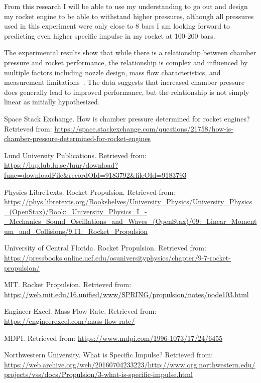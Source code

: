 \documentclass[12pt,a4paper]{article}
\begin{document}
From this research I will be able to use my understanding to go out and design my rocket engine to be able to withstand higher pressures, although all pressures used in this experiment were only close to 8 bars I am looking forward to predicting even higher specific impulse in my rocket at 100-200 bars.

The experimental results show that while there is a relationship between chamber pressure and rocket performance, the relationship is complex and influenced by multiple factors including nozzle design, mass flow characteristics, and measurement limitations~\cite{erau}. The data suggests that increased chamber pressure does generally lead to improved performance, but the relationship is not simply linear as initially hypothesized.


\begin{thebibliography}{13}
 Space Stack Exchange. How is chamber pressure determined for rocket engines? Retrieved from: \url{https://space.stackexchange.com/questions/21758/how-is-chamber-pressure-determined-for-rocket-engines}

 Lund University Publications. Retrieved from: \url{https://lup.lub.lu.se/luur/download?func=downloadFile&recordOId=9183792&fileOId=9183793}

 Physics LibreTexts. Rocket Propulsion. Retrieved from: \url{https://phys.libretexts.org/Bookshelves/University_Physics/University_Physics_(OpenStax)/Book:_University_Physics_I_-_Mechanics_Sound_Oscillations_and_Waves_(OpenStax)/09:_Linear_Momentum_and_Collisions/9.11:_Rocket_Propulsion}

 University of Central Florida. Rocket Propulsion. Retrieved from: \url{https://pressbooks.online.ucf.edu/osuniversityphysics/chapter/9-7-rocket-propulsion/}

 MIT. Rocket Propulsion. Retrieved from: \url{https://web.mit.edu/16.unified/www/SPRING/propulsion/notes/node103.html}

 Engineer Excel. Mass Flow Rate. Retrieved from: \url{https://engineerexcel.com/mass-flow-rate/}

 MDPI. Retrieved from: \url{https://www.mdpi.com/1996-1073/17/24/6455}

 Northwestern University. What is Specific Impulse? Retrieved from: \url{https://web.archive.org/web/20160704233223/http://www.qrg.northwestern.edu/projects/vss/docs/Propulsion/3-what-is-specific-impulse.html}


\end{thebibliography}
\end{document}
